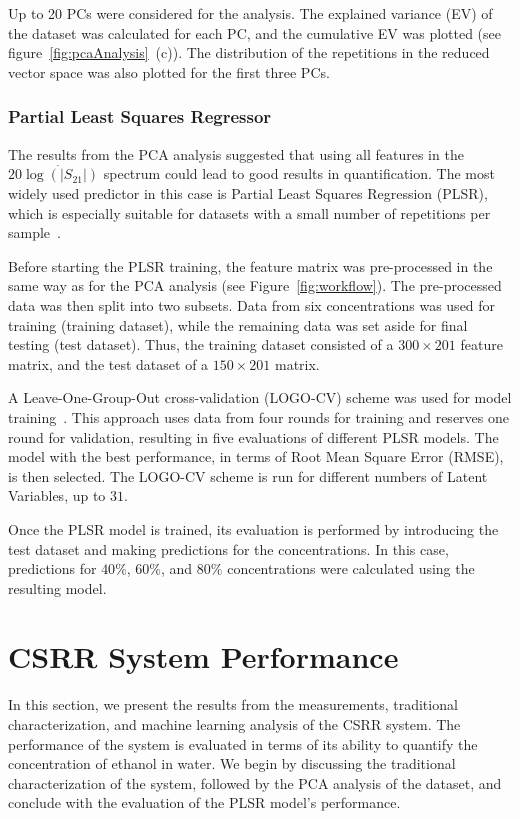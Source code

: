 \documentclass[journal,twoside,web]{ieeecolor}
\begin{document}
Up to 20 PCs were considered for the analysis. The explained variance (EV) of the dataset was calculated for each PC, and the cumulative EV was plotted (see figure~\ref{fig:pcaAnalysis}~(c)). The distribution of the repetitions in the reduced vector space was also plotted for the first three PCs.  

\subsubsection{Partial Least Squares Regressor}
\label{sssec:pls}

The results from the PCA analysis suggested that using all features in the $20\dot{\log\left(|S_{21}|\right)}$ spectrum could lead to good results in quantification. The most widely used predictor in this case is Partial Least Squares Regression (PLSR), which is especially suitable for datasets with a small number of repetitions per sample~\cite{Wold2001}.

Before starting the PLSR training, the feature matrix was pre-processed in the same way as for the PCA analysis (see Figure~\ref{fig:workflow}). The pre-processed data was then split into two subsets. Data from six concentrations was used for training (training dataset), while the remaining data was set aside for final testing (test dataset). Thus, the training dataset consisted of a $300 \times 201$ feature matrix, and the test dataset of a $150 \times 201$ matrix.

A Leave-One-Group-Out cross-validation (LOGO-CV) scheme was used for model training~\cite{Filzmoser2009}. This approach uses data from four rounds for training and reserves one round for validation, resulting in five evaluations of different PLSR models. The model with the best performance, in terms of Root Mean Square Error (RMSE), is then selected. The LOGO-CV scheme is run for different numbers of Latent Variables, up to $31$.

Once the PLSR model is trained, its evaluation is performed by introducing the test dataset and making predictions for the concentrations. In this case, predictions for $40\%$, $60\%$, and $80\%$ concentrations were calculated using the resulting model.

\section{CSRR System Performance}
\label{sec:csrrPerformance}
In this section, we present the results from the measurements, traditional characterization, and machine learning analysis of the CSRR system. The performance of the system is evaluated in terms of its ability to quantify the concentration of ethanol in water. We begin by discussing the traditional characterization of the system, followed by the PCA analysis of the dataset, and conclude with the evaluation of the PLSR model's performance.
\end{document}
